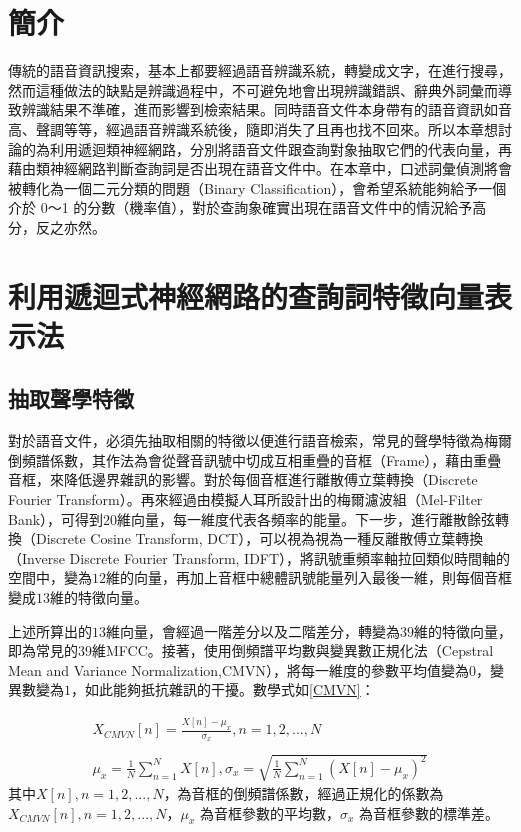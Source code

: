 \section{簡介}
傳統的語音資訊搜索，基本上都要經過語音辨識系統，轉變成文字，在進行搜尋，然而這種做法的缺點是辨識過程中，不可避免地會出現辨識錯誤、辭典外詞彙而導致辨識結果不準確，進而影響到檢索結果。同時語音文件本身帶有的語音資訊如音高、聲調等等，經過語音辨識系統後，隨即消失了且再也找不回來。所以本章想討論的為利用遞迴類神經網路，分別將語音文件跟查詢對象抽取它們的代表向量，再藉由類神經網路判斷查詢詞是否出現在語音文件中。在本章中，口述詞彙偵測將會被轉化為一個二元分類的問題（Binary
Classification），會希望系統能夠給予一個介於 0～1 的分數（機率值），對於查詢象確實出現在語音文件中的情況給予高分，反之亦然。


\section{利用遞迴式神經網路的查詢詞特徵向量表示法}
\subsection{抽取聲學特徵}
對於語音文件，必須先抽取相關的特徵以便進行語音檢索，常見的聲學特徵為梅爾倒頻譜係數，其作法為會從聲音訊號中切成互相重疊的音框（Frame），藉由重疊音框，來降低邊界雜訊的影響。對於每個音框進行離散傅立葉轉換（Discrete
Fourier Transform）。再來經過由模擬人耳所設計出的梅爾濾波組（Mel-Filter
Bank），可得到$20$維向量，每一維度代表各頻率的能量。下一步，進行離散餘弦轉換（Discrete
Cosine Transform, DCT），可以視為視為一種反離散傅立葉轉換（Inverse Discrete Fourier Transform,
IDFT），將訊號重頻率軸拉回類似時間軸的空間中，變為$12$維的向量，再加上音框中總體訊號能量列入最後一維，則每個音框變成$13$維的特徵向量。

上述所算出的$13$維向量，會經過一階差分以及二階差分，轉變為$39$維的特徵向量，即為常見的39維MFCC。接著，使用倒頻譜平均數與變異數正規化法（Cepstral
Mean and Variance
Normalization,CMVN），將每一維度的參數平均值變為$0$，變異數變為$1$，如此能夠抵抗雜訊的干擾。數學式如\ref{CMVN}：

\begin{equation}
\begin{aligned}
X_{CMVN}[n] = \frac{ X[n] - \mu_x }{ \sigma_x } ,n = 1,2,...,N
\\
\\
\mu_{x} = \frac{1}{N} \sum_{n=1}^N {X[n]}, \sigma_x = \sqrt{\frac{1}{N}\sum_{n=1}^N{ (X[n] -\mu_{x} )^2}}
\end{aligned}
\label{CMVN}
\end{equation}
其中$X[n],n= 1, 2, ...,N$，為音框的倒頻譜係數，經過正規化的係數為$X_{CMVN}[n],n =
1,2,...,N$，$\mu_x$ 為音框參數的平均數，$\sigma_x$ 為音框參數的標準差。

